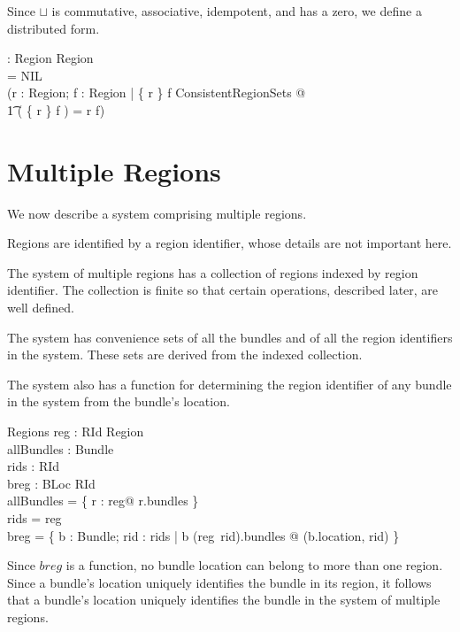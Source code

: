 \documentclass[a4paper,9pt,twoside]{article}
\begin{document}
Since $\sqcup$ is commutative, associative, idempotent, and has a zero, we define a distributed form.
\begin{axdef}
  \bigsqcup : \finset Region \pfun Region \\
\where
  \bigsqcup \emptyset = NIL \land \\
  (\forall r : Region; f : \finset Region | \{ r \} \cup f \in ConsistentRegionSets @ \\
\t1 \bigsqcup( \{ r \} \cup f ) = r \sqcup \bigsqcup f) \\ 
\end{axdef}
  
\clearpage
\section{Multiple Regions}
\label{cha:multiregions}

We now describe a system comprising multiple regions.

Regions are identified by a region identifier, whose details are not important here.
\begin{zed}
  [RId]
\end{zed}

The system of multiple regions has a collection of regions indexed by region identifier.
The collection is finite so that certain operations, described later, are well defined.
 
The system has convenience sets of all the bundles and of all the region identifiers in the system.
These sets are derived from the indexed collection.

The system also has a function for determining the region identifier of any bundle in the system from the
bundle's location.
\begin{schema}{Regions}
  reg : RId \ffun Region \\
  allBundles : \power Bundle \\
  rids : \power RId \\
  breg : BLoc \pfun RId \\
\where
 allBundles = \bigcup \{ r : \ran reg@ r.bundles \} \\
 rids = \dom reg \\
 breg = \{ b : Bundle; rid : rids | b \in (reg~rid).bundles @ (b.location, rid) \} \\
\end{schema}
Since $breg$ is a function, no bundle location can belong to more than one region.
Since a bundle's location uniquely identifies the bundle in its region, it follows that a bundle's location uniquely identifies the bundle in the system of multiple regions.
\end{document}
